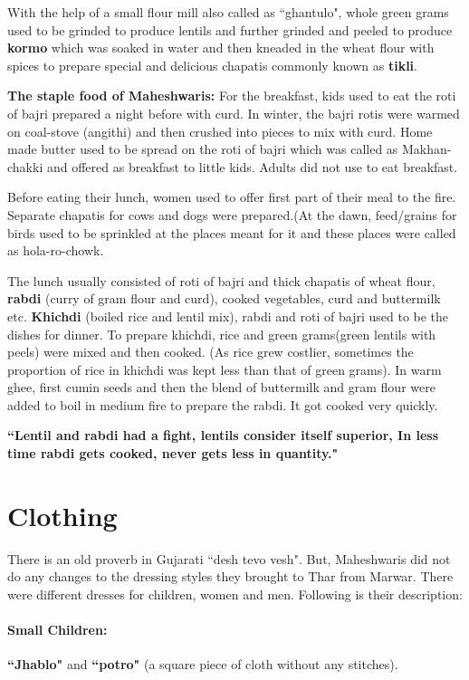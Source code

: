 With the help of a small flour mill also called as ``ghantulo", whole green grams used to be grinded to produce lentils and further grinded and peeled to produce \textbf{kormo} which was soaked in water and then kneaded in the wheat flour with spices to prepare special and delicious chapatis commonly known as \textbf{tikli}.

\textbf{The staple food of Maheshwaris:} For the breakfast, kids used to eat the roti of bajri prepared a night before with curd. In winter, the bajri rotis were warmed on coal-stove (angithi) and then crushed into pieces to mix with curd. Home made butter used to be spread on the roti of bajri which was called as Makhan-chakki and offered as breakfast to little kids. Adults did not use to eat breakfast.

Before eating their lunch, women used to offer first part of their meal to the fire. Separate chapatis for cows and dogs were prepared.(At the dawn, feed/grains for birds used to be sprinkled at the places meant for it and these places were called as hola-ro-chowk.

The lunch usually consisted of roti of bajri and thick chapatis of wheat flour, \textbf{rabdi} (curry of gram flour and curd), cooked vegetables, curd and buttermilk etc. \textbf{Khichdi} (boiled rice and lentil mix), rabdi and roti of bajri used to be the dishes for dinner. To prepare khichdi, rice and green grams(green lentils with peels) were mixed and then cooked. (As rice grew costlier, sometimes the proportion of rice in khichdi was kept less than that of green grams). In warm ghee, first cumin seeds and then the blend of buttermilk and gram flour were added to boil in medium fire to prepare the rabdi. It got cooked very quickly.

\textbf{``Lentil and rabdi had a fight, lentils consider itself superior, In less time rabdi gets cooked, never gets less in quantity."}
\section{Clothing}
There is an old proverb in Gujarati ``desh tevo vesh". But, Maheshwaris did not do any changes to the dressing styles they brought to Thar from Marwar. There were different dresses for children, women and men. Following is their description:
\paragraph{Small Children:} \textbf{``Jhablo"} and \textbf{``potro"} (a square piece of cloth without any stitches).
